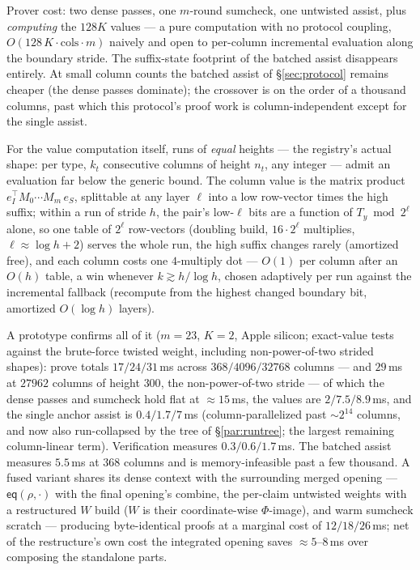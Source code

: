\documentclass[11pt]{article}
\newcommand{\eq}{\mathsf{eq}}
\begin{document}
Prover cost: two dense passes, one $m$-round sumcheck, one untwisted
assist, plus \emph{computing} the $128 K$ values --- a pure
computation with no protocol coupling, $O(128\,K \cdot \mathrm{cols}
\cdot m)$ naively and open to per-column incremental evaluation along
the boundary stride. The suffix-state footprint of the batched assist
disappears entirely. At small column counts the batched assist of
\S\ref{sec:protocol} remains cheaper (the dense passes dominate);
the crossover is on the order of a thousand columns, past which this
protocol's proof work is column-independent except for the single
assist.

For the value computation itself, runs of \emph{equal} heights ---
the registry's actual shape: per type, $k_t$ consecutive columns of
height $n_t$, any integer --- admit an evaluation far below the
generic bound. The column value is the matrix product
$e_I^{\!\top} M_0 \cdots M_m\, e_S$, splittable at any layer $\ell$
into a low row-vector times the high suffix; within a run of stride
$h$, the pair's low-$\ell$ bits are a function of $T_y \bmod 2^\ell$
alone, so one table of $2^\ell$ row-vectors (doubling build,
$16 \cdot 2^\ell$ multiplies, $\ell \approx \log h + 2$) serves the
whole run, the high suffix changes rarely (amortized free), and each
column costs one $4$-multiply dot --- $O(1)$ per column after an
$O(h)$ table, a win whenever $k \gtrsim h/\log h$, chosen adaptively
per run against the incremental fallback (recompute from the highest
changed boundary bit, amortized $O(\log h)$ layers).

A prototype confirms all of it ($m = 23$, $K = 2$, Apple silicon;
exact-value tests against the brute-force twisted weight, including
non-power-of-two strided shapes): prove totals $17 / 24 / 31$\,ms
across $368 / 4096 / 32768$ columns --- and $29$\,ms at $27962$
columns of height $300$, the non-power-of-two stride --- of which the
dense passes and sumcheck hold flat at ${\approx}15$\,ms, the values
are $2 / 7.5 / 8.9$\,ms, and the single anchor assist is
$0.4 / 1.7 / 7$\,ms (column-parallelized past ${\sim}2^{14}$ columns,
and now also run-collapsed by the tree of \S\ref{par:runtree}; the
largest remaining column-linear term). Verification measures
$0.3 / 0.6 / 1.7$\,ms. The batched assist measures $5.5$\,ms at $368$
columns and is memory-infeasible past a few thousand. A fused variant
shares its dense context with the surrounding merged opening ---
$\eq(\rho,\cdot)$ with the final opening's combine, the per-claim
untwisted weights with a restructured $W$ build ($W$ is their
coordinate-wise $\Phi$-image), and warm sumcheck scratch --- producing
byte-identical proofs at a marginal cost of $12 / 18 / 26$\,ms; net of
the restructure's own cost the integrated opening saves
${\approx}5$--$8$\,ms over composing the standalone parts.
\end{document}
